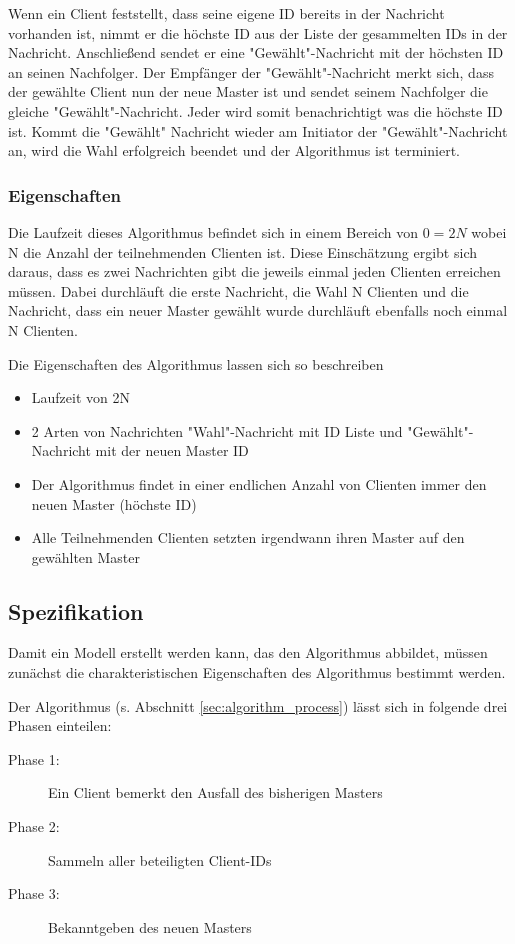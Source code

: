 Wenn ein Client feststellt, dass seine eigene ID bereits in der Nachricht vorhanden ist, nimmt er die höchste ID aus der Liste der gesammelten IDs in der Nachricht. Anschließend sendet er eine "Gewählt"-Nachricht mit der höchsten ID an seinen Nachfolger. Der Empfänger der "Gewählt"-Nachricht merkt sich, dass der gewählte Client nun der neue Master ist und sendet seinem Nachfolger die gleiche "Gewählt"-Nachricht. Jeder wird somit benachrichtigt was die höchste ID ist. Kommt die "Gewählt" Nachricht wieder am Initiator der "Gewählt"-Nachricht an, wird die Wahl erfolgreich beendet und der Algorithmus ist terminiert.

\subsubsection*{Eigenschaften}
Die Laufzeit dieses Algorithmus befindet sich in einem Bereich von $0=2N$ wobei N die Anzahl der teilnehmenden Clienten ist. Diese Einschätzung ergibt sich daraus, dass es zwei Nachrichten gibt die jeweils einmal jeden Clienten erreichen müssen. Dabei durchläuft die erste Nachricht, die Wahl N Clienten und die Nachricht, dass ein neuer Master gewählt wurde durchläuft ebenfalls noch einmal N Clienten.
 
Die Eigenschaften des Algorithmus lassen sich so beschreiben
 \begin{itemize}
	\item Laufzeit von 2N
	\item 2 Arten von Nachrichten "Wahl"-Nachricht mit ID Liste und "Gewählt"-Nachricht mit der neuen Master ID
	\item Der Algorithmus findet in einer endlichen Anzahl von Clienten immer den neuen Master (höchste ID)
	\item Alle Teilnehmenden Clienten setzten irgendwann ihren Master auf den gewählten Master 
\end{itemize}

\subsection{Spezifikation}
Damit ein Modell erstellt werden kann, das den Algorithmus abbildet, müssen zunächst die charakteristischen Eigenschaften des Algorithmus bestimmt werden.

Der Algorithmus (s. Abschnitt \ref{sec:algorithm_process}) lässt sich in folgende drei Phasen einteilen:
\begin{description}
\item[Phase 1:] Ein Client bemerkt den Ausfall des bisherigen Masters
\item[Phase 2:] Sammeln aller beteiligten Client-IDs
\item[Phase 3:] Bekanntgeben des neuen Masters
\end{description}

